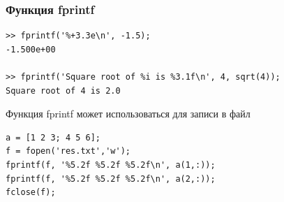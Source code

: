 \documentclass[11pt, compress]{beamer}
\begin{document}
\begin{frame}[fragile]
\frametitle{Функция fprintf}
\begin{lstlisting}
>> fprintf('%+3.3e\n', -1.5);
-1.500e+00

>> fprintf('Square root of %i is %3.1f\n', 4, sqrt(4));
Square root of 4 is 2.0
\end{lstlisting}

Функция \alert{fprintf} может использоваться для записи в файл
\begin{lstlisting}
a = [1 2 3; 4 5 6];  
f = fopen('res.txt','w');  
fprintf(f, '%5.2f %5.2f %5.2f\n', a(1,:));
fprintf(f, '%5.2f %5.2f %5.2f\n', a(2,:));
fclose(f);
\end{lstlisting}


\end{frame}









\end{document}
